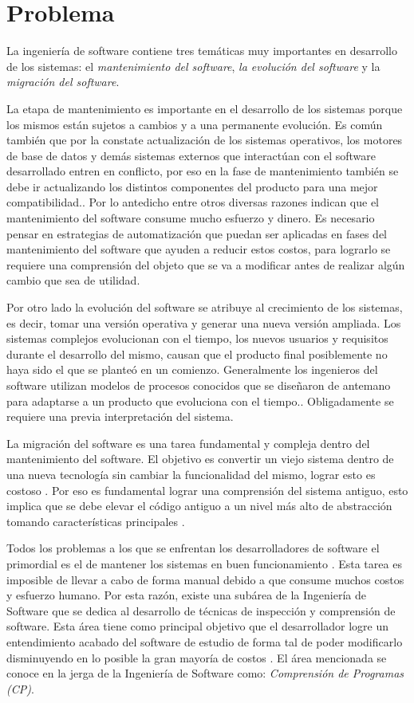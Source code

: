 \documentclass[12pt]{report}
\begin{document}
\section{Problema}

La ingeniería de software contiene tres temáticas muy importantes en desarrollo de los sistemas: el \textit{mantenimiento del software}, \textit{la evolución del software} y la \textit{migración del software}.

La etapa de mantenimiento es importante en el desarrollo de los sistemas porque los mismos están sujetos a cambios y a una permanente evolución\cite{PFT02}.
Es común también que por la constate actualización de los sistemas operativos, los motores de base de datos y demás sistemas externos que interactúan con el software desarrollado entren en conflicto, por eso en la fase de mantenimiento también se debe ir actualizando los distintos componentes del producto para una mejor compatibilidad.\cite{RSPMGH02}. Por lo antedicho entre otros diversas razones indican que el mantenimiento del software consume mucho esfuerzo y dinero. Es necesario pensar en estrategias de automatización que puedan ser aplicadas en fases del mantenimiento del software que ayuden a reducir estos costos, para lograrlo se requiere una comprensión del objeto que se va a modificar antes de realizar algún cambio que sea de utilidad.

Por otro lado la evolución del software se atribuye al crecimiento de los sistemas, es decir, tomar una versión operativa y generar una nueva versión ampliada.
Los sistemas complejos evolucionan con el tiempo, los nuevos usuarios y requisitos durante el desarrollo del mismo, causan que el producto final posiblemente no haya sido el que se planteó en un comienzo. 
Generalmente los ingenieros del software utilizan modelos de procesos conocidos que se diseñaron de antemano para adaptarse a un producto que evoluciona con el tiempo.\cite{RSPMGH02}. Obligadamente se requiere una previa interpretación del sistema.


La migración del software es una tarea fundamental y compleja dentro del mantenimiento del software. El objetivo es convertir un viejo sistema dentro de una nueva tecnología sin cambiar la funcionalidad del mismo, lograr esto es costoso \cite{WHAFVR11}. Por eso es fundamental lograr una comprensión del sistema antiguo, esto implica que se debe elevar el código antiguo a un nivel más alto de abstracción tomando características principales \cite{MMFAF07}.

Todos los problemas a los que se enfrentan los desarrolladores de software el primordial es el de mantener los sistemas en buen funcionamiento \cite{VMAVA95}. 
Esta tarea es imposible de llevar a cabo de forma manual debido a que consume 
muchos costos y esfuerzo humano. 
Por esta razón, existe una subárea de la Ingeniería de Software que se  
dedica al desarrollo de técnicas de inspección y comprensión de software. 
Esta área tiene como principal objetivo que el desarrollador logre un entendimiento 
acabado del software de estudio de forma tal de poder modificarlo disminuyendo en lo posible la gran mayoría de costos \cite{BRM10}. 
El área mencionada se conoce en la jerga de la Ingeniería de Software como: 
\textit{Comprensión de Programas (CP)}.
\end{document}

